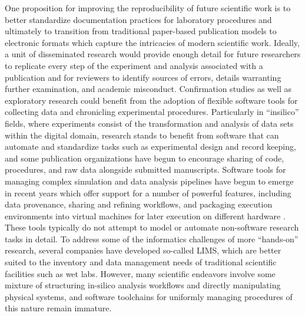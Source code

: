 \documentclass[../thesis]{subfiles}
\begin{document}
One proposition for improving the reproducibility of future scientific
work is to better standardize documentation practices for laboratory
procedures \cite{10.1371/journal.pmed.0020124} and ultimately to
transition from traditional paper-based publication models to
electronic formats which capture the intricacies of modern scientific
work. Ideally, a unit of disseminated research would provide enough
detail for future researchers to replicate every step of the
experiment and analysis associated with a publication and for
reviewers to identify sources of errors, details warranting further
examination, and academic misconduct. Confirmation studies as well as
exploratory research could benefit from the adoption of flexible
software tools for collecting data and chronicling experimental
procedures. Particularly in ``\gls{insilico}'' fields, where
experiments consist of the transformation and analysis of data sets
within the digital domain, research stands to benefit from
software that can automate and standardize tasks such as
experimental design and record keeping, and some publication
organizations have begun to encourage sharing of code, procedures, and
raw data alongside submitted manuscripts.
Software tools for managing complex simulation and data analysis
pipelines have begun to emerge in recent years which offer support for a number of powerful features,
including data provenance, sharing and refining workflows, and
packaging execution environments into virtual machines for
later execution on different hardware \cite{VisTrails, Taverna}.
These tools typically do not attempt to model or automate non-software
research tasks in detail.
To address some of the informatics challenges of more ``hands-on''
research, several companies have developed
so-called \gls{LIMS}, which are
better suited to the inventory and data management needs of
traditional scientific facilities such as wet labs.
However, many scientific endeavors involve some mixture of
structuring \gls{in-silico} analysis workflows and directly
manipulating physical systems, and software toolchains for uniformly
managing procedures of this nature remain immature.
\end{document}
